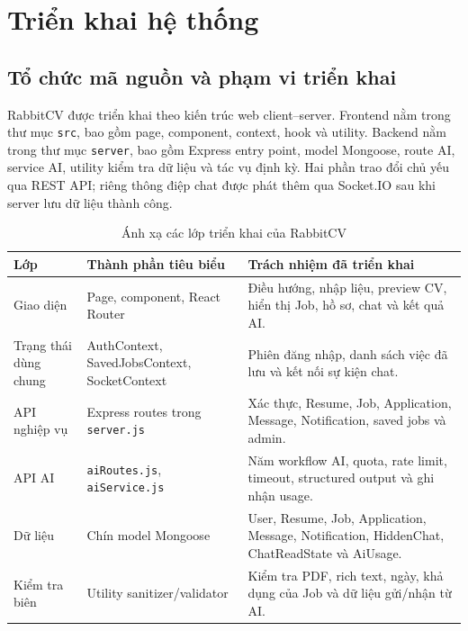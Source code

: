 \chapter{Triển khai hệ thống}

\section{Tổ chức mã nguồn và phạm vi triển khai}

RabbitCV được triển khai theo kiến trúc web client--server. Frontend nằm trong thư mục \texttt{src}, bao gồm page, component, context, hook và utility. Backend nằm trong thư mục \texttt{server}, bao gồm Express entry point, model Mongoose, route AI, service AI, utility kiểm tra dữ liệu và tác vụ định kỳ. Hai phần trao đổi chủ yếu qua REST API; riêng thông điệp chat được phát thêm qua Socket.IO sau khi server lưu dữ liệu thành công.

\begin{table}[H]
    \centering
    \small
    \begin{tabularx}{\textwidth}{|p{}|p{}|Y|} \hline
        \textbf{Lớp} & \textbf{Thành phần tiêu biểu} & \textbf{Trách nhiệm đã triển khai} \\ \hline
        Giao diện & Page, component, React Router & Điều hướng, nhập liệu, preview CV, hiển thị Job, hồ sơ, chat và kết quả AI. \\ \hline
        Trạng thái dùng chung & AuthContext, SavedJobsContext, SocketContext & Phiên đăng nhập, danh sách việc đã lưu và kết nối sự kiện chat. \\ \hline
        API nghiệp vụ & Express routes trong \texttt{server.js} & Xác thực, Resume, Job, Application, Message, Notification, saved jobs và admin. \\ \hline
        API AI & \texttt{aiRoutes.js}, \texttt{aiService.js} & Năm workflow AI, quota, rate limit, timeout, structured output và ghi nhận usage. \\ \hline
        Dữ liệu & Chín model Mongoose & User, Resume, Job, Application, Message, Notification, HiddenChat, ChatReadState và AiUsage. \\ \hline
        Kiểm tra biên & Utility sanitizer/validator & Kiểm tra PDF, rich text, ngày, khả dụng của Job và dữ liệu gửi/nhận từ AI. \\ \hline
    \end{tabularx}
    \caption{Ánh xạ các lớp triển khai của RabbitCV}
    \label{tab:implementation-layers}
\end{table}

